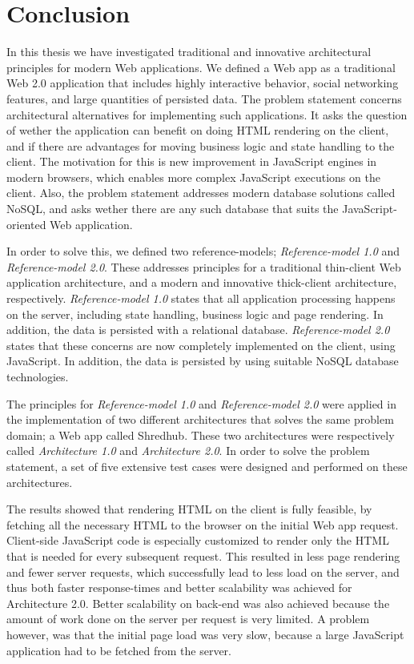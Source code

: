 \chapter{Conclusion}
In this thesis we have investigated traditional and innovative architectural principles for modern Web applications. We defined a Web app as a traditional Web 2.0 application that includes highly interactive behavior, social networking features, and large quantities of persisted data. The problem statement concerns architectural alternatives for implementing such applications. It asks the question of wether the application can benefit on doing HTML rendering on the client, and if there are advantages for moving business logic and state handling to the client. The motivation for this is new improvement in JavaScript engines in modern browsers, which enables more complex JavaScript executions on the client. Also, the problem statement addresses modern database solutions called NoSQL, and asks wether there are any such database that suits the JavaScript-oriented Web application.

In order to solve this, we defined two reference-models; \textit{Reference-model 1.0} and \textit{Reference-model 2.0}. These addresses principles for a traditional thin-client Web application architecture, and a modern and innovative thick-client architecture, respectively. \textit{Reference-model 1.0} states that all application processing happens on the server, including state handling, business logic and page rendering. In addition, the data is persisted with a relational database. \textit{Reference-model 2.0} states that these concerns are now completely implemented on the client, using JavaScript. In addition, the data is persisted by using suitable NoSQL database technologies. 

The principles for \textit{Reference-model 1.0} and \textit{Reference-model 2.0} were applied in the implementation of two different architectures that solves the same problem domain; a Web app called Shredhub. These two architectures were respectively called \textit{Architecture 1.0} and \textit{Architecture 2.0}. In order to solve the problem statement, a set of five extensive test cases were designed and performed on these architectures. 

The results showed that rendering HTML on the client is fully feasible, by fetching all the necessary HTML to the browser on the initial Web app request. Client-side JavaScript code is especially customized to render only the HTML that is needed for every subsequent request. This resulted in less page rendering and fewer server requests, which successfully lead to less load on the server, and thus both faster response-times and better scalability was achieved for Architecture 2.0. Better scalability on back-end was also achieved because the amount of work done on the server per request is very limited. A problem however, was that the initial page load was very slow, because a large JavaScript application had to be fetched from the server. 

